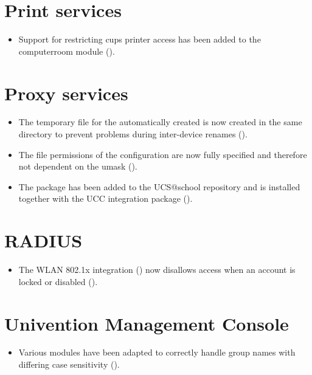 \section{Print services}
\begin{itemize}
\item Support for restricting cups printer access has been added to the computerroom module ().
\end{itemize}

\section{Proxy services}
\begin{itemize}
\item The temporary file for the automatically created  is now created in the same directory to prevent problems during inter-device renames ().
\item The file permissions of the  configuration are now fully specified and therefore not dependent on the umask ().
\item The package  has been added to the
UCS@school repository and is installed together with the UCC integration
package  ().
\end{itemize}

\section{RADIUS}
\begin{itemize}
\item The WLAN 802.1x integration () now disallows access when an account is locked or disabled ().
\end{itemize}

%

\section{Univention Management Console}
\begin{itemize}
\item Various  modules have been adapted to correctly handle group names with differing case sensitivity ().
\end{itemize}


